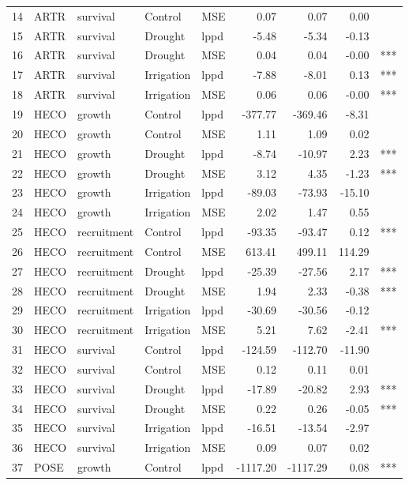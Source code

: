 \begin{longtable}{rllllrrrl}
  14 & ARTR & survival & Control & MSE & 0.07 & 0.07 & 0.00 &  \\ 
  15 & ARTR & survival & Drought & lppd & -5.48 & -5.34 & -0.13 &  \\ 
  16 & ARTR & survival & Drought & MSE & 0.04 & 0.04 & -0.00 & *** \\ 
  17 & ARTR & survival & Irrigation & lppd & -7.88 & -8.01 & 0.13 & *** \\ 
  18 & ARTR & survival & Irrigation & MSE & 0.06 & 0.06 & -0.00 & *** \\ 
  19 & HECO & growth & Control & lppd & -377.77 & -369.46 & -8.31 &  \\ 
  20 & HECO & growth & Control & MSE & 1.11 & 1.09 & 0.02 &  \\ 
  21 & HECO & growth & Drought & lppd & -8.74 & -10.97 & 2.23 & *** \\ 
  22 & HECO & growth & Drought & MSE & 3.12 & 4.35 & -1.23 & *** \\ 
  23 & HECO & growth & Irrigation & lppd & -89.03 & -73.93 & -15.10 &  \\ 
  24 & HECO & growth & Irrigation & MSE & 2.02 & 1.47 & 0.55 &  \\ 
  25 & HECO & recruitment & Control & lppd & -93.35 & -93.47 & 0.12 & *** \\ 
  26 & HECO & recruitment & Control & MSE & 613.41 & 499.11 & 114.29 &  \\ 
  27 & HECO & recruitment & Drought & lppd & -25.39 & -27.56 & 2.17 & *** \\ 
  28 & HECO & recruitment & Drought & MSE & 1.94 & 2.33 & -0.38 & *** \\ 
  29 & HECO & recruitment & Irrigation & lppd & -30.69 & -30.56 & -0.12 &  \\ 
  30 & HECO & recruitment & Irrigation & MSE & 5.21 & 7.62 & -2.41 & *** \\ 
  31 & HECO & survival & Control & lppd & -124.59 & -112.70 & -11.90 &  \\ 
  32 & HECO & survival & Control & MSE & 0.12 & 0.11 & 0.01 &  \\ 
  33 & HECO & survival & Drought & lppd & -17.89 & -20.82 & 2.93 & *** \\ 
  34 & HECO & survival & Drought & MSE & 0.22 & 0.26 & -0.05 & *** \\ 
  35 & HECO & survival & Irrigation & lppd & -16.51 & -13.54 & -2.97 &  \\ 
  36 & HECO & survival & Irrigation & MSE & 0.09 & 0.07 & 0.02 &  \\ 
  37 & POSE & growth & Control & lppd & -1117.20 & -1117.29 & 0.08 & *** \\ 

\end{longtable}
